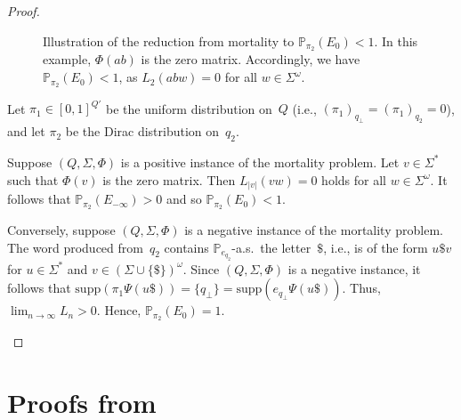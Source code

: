 \documentclass[a4paper,UKenglish,cleveref, autoref,mathscr]{lipics-v2019}
\newcommand{\PP}{\mathbb{P}}
\newcommand{\1}{\mathbbm{1}}
\newcommand{\supp}{\mathrm{supp}}
\begin{document}
\begin{proof}
\begin{enumerate}
\begin{figure}[ht]
\begin{center}
\end{center}
\caption{Illustration of the reduction from mortality to $\PP_{\pi_2}(E_0)<1$.
In this example, $\Phi(a b)$ is the zero matrix.
Accordingly, we have $\PP_{\pi_2}(E_0) < 1$, as $L_2(a b w) = 0$ for all $w \in \Sigma^\omega$.}
\label{fig:PSPACE-hardness}
\end{figure}
Let $\pi_1 \in [0,1]^{Q'}$ be the uniform distribution on~$Q$ (i.e., $(\pi_1)_{q_\bot} = (\pi_1)_{q_2} = 0$), and let $\pi_2$ be the Dirac distribution on~$q_2$.

Suppose $(Q,\Sigma,\Phi)$ is a positive instance of the mortality problem.
Let $v \in \Sigma^*$ such that $\Phi(v)$ is the zero matrix.
Then $L_{|v|}(v w) = 0$ holds for all $w \in \Sigma^\omega$.
It follows that $\PP_{\pi_2}(E_{-\infty})>0$ and so $\PP_{\pi_2}(E_0)<1$.

Conversely, suppose $(Q,\Sigma,\Phi)$ is a negative instance of the mortality problem.
The word produced from~$q_2$ contains $\PP_{e_{q_2}}$-a.s.\ the letter~$\$$, i.e., is of the form $u \$ v$ for $u \in \Sigma^*$ and $v \in (\Sigma \cup \{\$\})^\omega$.
Since $(Q,\Sigma,\Phi)$ is a negative instance, it follows that $\supp(\pi_1 \Psi(u \$)) = \{q_\bot\} = \supp(e_{q_\bot} \Psi(u \$))$.
Thus, $\lim_{n \to \infty} L_n > 0$. 
Hence, $\PP_{\pi_2}(E_0)=1$.
\qedhere
\end{enumerate}
\end{proof}

\section{Proofs from }
\end{document}
